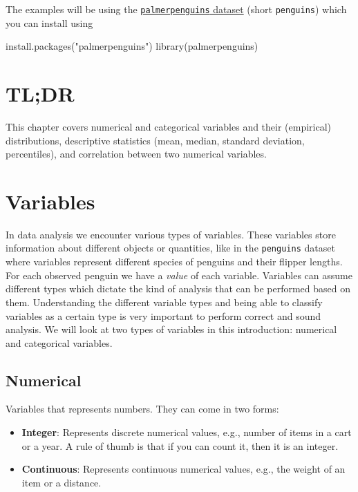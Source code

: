\documentclass[
  letterpaper,
  DIV=11,
  numbers=noendperiod]{scrreprt}
\newenvironment{Shaded}{\begin{snugshade}}{\end{snugshade}}
\newcommand{\FunctionTok}[1]{\textcolor[rgb]{0.28,0.35,0.67}{#1}}
\newcommand{\NormalTok}[1]{\textcolor[rgb]{0.00,0.23,0.31}{#1}}
\newcommand{\StringTok}[1]{\textcolor[rgb]{0.13,0.47,0.30}{#1}}
\providecommand{\tightlist}{%
  \setlength{\itemsep}{0pt}\setlength{\parskip}{0pt}}\usepackage{longtable,booktabs,array}
\begin{document}
The examples will be using the
\href{https://www.rdocumentation.org/packages/palmerpenguins/versions/0.1.1}{\texttt{palmerpenguins}
dataset} (short \texttt{penguins}) which you can install using

\begin{Shaded}
\begin{Highlighting}[]
\FunctionTok{install.packages}\NormalTok{(}\StringTok{"palmerpenguins"}\NormalTok{)}
\FunctionTok{library}\NormalTok{(palmerpenguins)}
\end{Highlighting}
\end{Shaded}

\section{TL;DR}\label{tldr-1}

This chapter covers numerical and categorical variables and their
(empirical) distributions, descriptive statistics (mean, median,
standard deviation, percentiles), and correlation between two numerical
variables.

\section{Variables}\label{variables}

In data analysis we encounter various types of variables. These
variables store information about different objects or quantities, like
in the \texttt{penguins} dataset where variables represent different
species of penguins and their flipper lengths. For each observed penguin
we have a \emph{value} of each variable. Variables can assume different
types which dictate the kind of analysis that can be performed based on
them. Understanding the different variable types and being able to
classify variables as a certain type is very important to perform
correct and sound analysis. We will look at two types of variables in
this introduction: numerical and categorical variables.

\subsection{Numerical}\label{numerical}

Variables that represents numbers. They can come in two forms:

\begin{itemize}
\tightlist
\item
  \textbf{Integer}: Represents discrete numerical values, e.g., number
  of items in a cart or a year. A rule of thumb is that if you can count
  it, then it is an integer.
\item
  \textbf{Continuous}: Represents continuous numerical values, e.g., the
  weight of an item or a distance.
\end{itemize}
\end{document}
